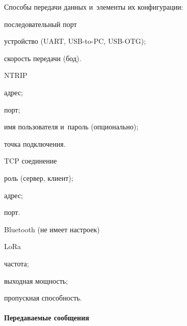 Способы передачи данных и~элементы их конфигурации:
\begin{dashitemize}
  \item последовательный порт
  \begin{dashitemize}
    \item устройство (UART, USB-to-PC, USB-OTG);
    \item скорость передачи (бод).
  \end{dashitemize}

  \item NTRIP
  \begin{dashitemize}
    \item адрес;
    \item порт;
    \item имя пользователя и~пароль (опционально);
    \item точка подключения.
  \end{dashitemize}

  \item TCP соединение
  \begin{dashitemize}
    \item роль (сервер, клиент);
    \item адрес;
    \item порт.
  \end{dashitemize}

  \item Bluetooth (не имеет настроек)

  \item LoRa
  \begin{dashitemize}
    \item частота;
    \item выходная мощность;
    \item пропускная способность.
  \end{dashitemize}
\end{dashitemize}

\paragraph{Передаваемые сообщения}

